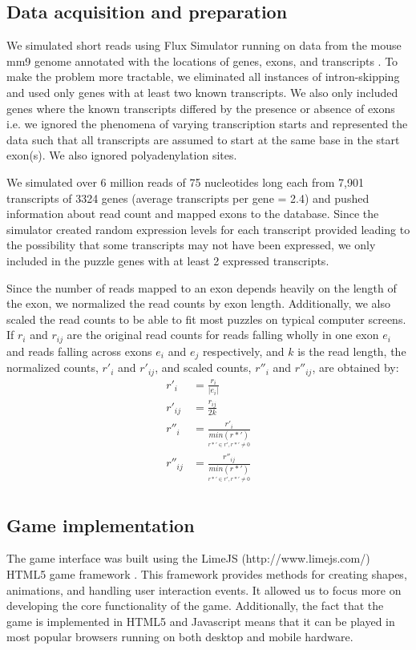 \documentclass[12pt]{article}
\begin{document}
\subsection*{Data acquisition and preparation}
We simulated short reads using Flux Simulator \citep{sammeth2010flux} running on data from the mouse mm9 genome annotated with the locations of genes, exons, and transcripts \citep{karolchik2008ucsc}. To make the problem more tractable, we eliminated all instances of intron-skipping and used only genes with at least two known transcripts. We also only included genes where the known transcripts differed by the presence or absence of exons i.e. we ignored the phenomena of varying transcription starts and represented the data such that all transcripts are assumed to start at the same base in the start exon(s). We also ignored polyadenylation sites. 

We simulated over 6 million reads of 75 nucleotides long each from 7,901 transcripts of 3324 genes (average transcripts per gene = 2.4) and pushed information about read count and mapped exons to the database. Since the simulator created random expression levels for each transcript provided leading to the possibility that some transcripts may not have been expressed, we only included in the puzzle genes with at least 2 expressed transcripts.

Since the number of reads mapped to an exon depends heavily on the length of the exon, we normalized the read counts by exon length. Additionally, we also scaled the read counts to be able to fit most puzzles on typical computer screens. If $r_i$ and $r_{ij}$ are the original read counts for reads falling wholly in one exon $e_i$ and reads falling across exons $e_i$ and $e_j$ respectively, and $k$ is the read length, the normalized counts,  $r'_i$ and $r'_{ij}$, and scaled counts, $r''_i$ and $r''_{ij}$, are obtained by:
\begin{align*}
r'_i &= \frac{r_i}{|e_i|} \\
r'_{ij} &= \frac{r_{ij}}{2k} \\
r''_i &= \frac{r'_i}{\underset{r*' \in r', r*' \not = 0}{min(r*')}} \\
r''_{ij} &= \frac{r''_{ij}}{\underset{r*' \in r', r*' \not = 0}{min(r*')}} \\
\end{align*}

\subsection*{Game implementation}
The game interface was built using the LimeJS (http://www.limejs.com/) HTML5 game framework . This framework provides methods for creating shapes,
animations, and handling user interaction events. It allowed us to focus more on developing the core functionality of the game.
Additionally, the fact that the game is implemented in HTML5 and Javascript means that it can be played in most popular browsers running on both desktop and mobile hardware.
\end{document}
